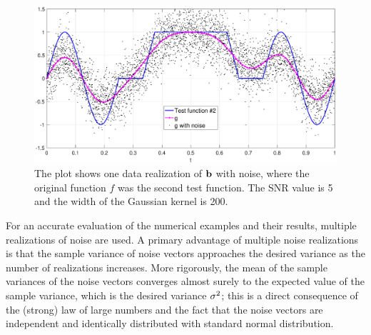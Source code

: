 \begin{figure}
	\centerline{\includegraphics[scale = 0.45]{Figures/NoisePlot1D_F2_S05_W200.eps}}
\caption{The plot shows one data realization of $\mathbf{b}$ with noise, where the original function $f$ was the second test function. The SNR value is 5 and the width of the Gaussian kernel is 200.}
\label{NoisePlot1D_F2_S05_W200}
\end{figure}

For an accurate evaluation of the numerical examples and their results, multiple realizations of noise are used. A primary advantage of multiple noise realizations is that the sample variance of noise vectors approaches the desired variance as the number of realizations increases. More rigorously, the mean of the sample variances of the noise vectors converges almost surely to the expected value of the sample variance, which is the desired variance $\sigma^2$; this is a direct consequence of the (strong) law of large numbers and the fact that the noise vectors are independent and identically distributed with standard normal distribution.

